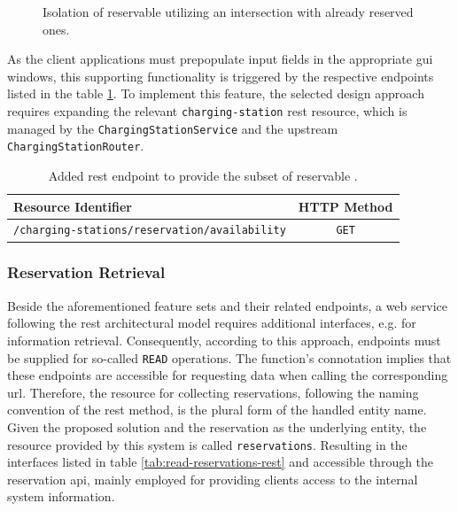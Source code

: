 \begin{figure}[h]
    \centering
    \caption{Isolation of reservable  utilizing an intersection with already reserved ones.}
    \label{fig:reservable-cs}
\end{figure}

\noindent As the client applications must prepopulate input fields in the appropriate \acrshort{gui} windows, this supporting functionality is triggered by the respective endpoints listed in the table \ref{tab:reservable-cs-rest}. To implement this feature, the selected design approach requires expanding the relevant \texttt{charging-station} \acrshort{rest} resource, which is managed by the \texttt{ChargingStationService} and the upstream \texttt{ChargingStationRouter}.

\begingroup
\setlength{\tabcolsep}{10pt} %
\renewcommand{\arraystretch}{1.5} %
\begin{table}[h]
\centering
\caption{Added \acrshort{rest} endpoint to provide the subset of reservable .}
    \begin{tabular}{l|c}
    Resource Identifier & HTTP Method \\ \hline
    \texttt{/charging-stations/reservation/availability} & \texttt{GET}
    \end{tabular}
\label{tab:reservable-cs-rest}
\end{table}
\endgroup

\subsubsection{Reservation Retrieval}
\label{ch:Implementation:sec:Reservation System:ssec:Additional Capabilities:sssec:Reservation Retrieval}

Beside the aforementioned feature sets and their related endpoints, a web service following the \acrshort{rest} architectural model requires additional interfaces, e.g. for information retrieval.
Consequently, according to this approach, endpoints must be supplied for so-called \texttt{READ} operations. The function's connotation implies that these endpoints are accessible for requesting data when calling the corresponding \acrshort{url}.
Therefore, the resource for collecting reservations, following the naming convention of the \acrshort{rest} method, is the plural form of the handled entity name. Given the proposed solution and the reservation as the underlying entity, the resource provided by this system is called \texttt{reservations}.
Resulting in the interfaces listed in table \ref{tab:read-reservations-rest} and accessible through the reservation \acrshort{api}, mainly employed for providing clients access to the internal system information.

